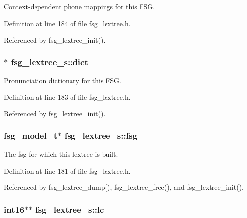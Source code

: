 Context-\/dependent phone mappings for this F\-S\-G. 



Definition at line 184 of file fsg\-\_\-lextree.\-h.



Referenced by fsg\-\_\-lextree\-\_\-init().

\subsubsection[{dict}]{$\ast$ fsg\-\_\-lextree\-\_\-s\-::dict}\label{structfsg__lextree__s_abf077af1c0dd1246b2032b917bfacba5}


Pronunciation dictionary for this F\-S\-G. 



Definition at line 183 of file fsg\-\_\-lextree.\-h.



Referenced by fsg\-\_\-lextree\-\_\-init().

\subsubsection[{fsg}]{\setlength{\rightskip}{0pt plus 5cm}fsg\-\_\-model\-\_\-t$\ast$ fsg\-\_\-lextree\-\_\-s\-::fsg}\label{structfsg__lextree__s_a161ff35c65373388f18e51236bf7ef5f}


The fsg for which this lextree is built. 



Definition at line 181 of file fsg\-\_\-lextree.\-h.



Referenced by fsg\-\_\-lextree\-\_\-dump(), fsg\-\_\-lextree\-\_\-free(), and fsg\-\_\-lextree\-\_\-init().

\subsubsection[{lc}]{\setlength{\rightskip}{0pt plus 5cm}int16$\ast$$\ast$ fsg\-\_\-lextree\-\_\-s\-::lc}\label{structfsg__lextree__s_a0655f40ec98c9d971aba1fa8a894575d}


